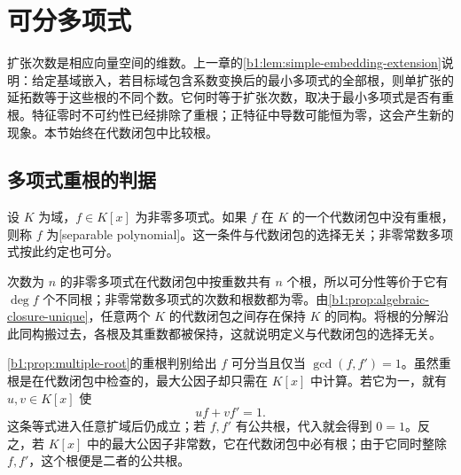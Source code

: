 
\section{可分多项式}
\label{b1:sec:1601}


%
%

扩张次数是相应向量空间的维数。上一章的\cref{b1:lem:simple-embedding-extension}说明：给定基域嵌入，若目标域包含系数变换后的最小多项式的全部根，则单扩张的延拓数等于这些根的不同个数。它何时等于扩张次数，取决于最小多项式是否有重根。特征零时不可约性已经排除了重根；正特征中导数可能恒为零，这会产生新的现象。本节始终在代数闭包中比较根。

\subsection{多项式重根的判据}
\label{b1:subsec:1601:01}

\begin{definition}\label{b1:def:separable-polynomial}
	设 \(K\) 为域，\(f\in K[x]\) 为非零多项式。如果 \(f\) 在 \(K\) 的一个代数闭包中没有重根，则称 \(f\) 为[separable polynomial]。这一条件与代数闭包的选择无关；非零常数多项式按此约定也可分。
\end{definition}
次数为 \(n\) 的非零多项式在代数闭包中按重数共有 \(n\) 个根，所以可分性等价于它有 \(\deg f\) 个不同根；非零常数多项式的次数和根数都为零。由\cref{b1:prop:algebraic-closure-unique}，任意两个 \(K\) 的代数闭包之间存在保持 \(K\) 的同构。将根的分解沿此同构搬过去，各根及其重数都被保持，这就说明定义与代数闭包的选择无关。

\ProseParagraphBreak
\cref{b1:prop:multiple-root}的重根判别给出 \(f\) 可分当且仅当 \(\gcd(f,f')=1\)。虽然重根是在代数闭包中检查的，最大公因子却只需在 \(K[x]\) 中计算。若它为一，就有 \(u,v\in K[x]\) 使
\[
	uf+vf'=1.
\]
这条等式进入任意扩域后仍成立；若 \(f,f'\) 有公共根，代入就会得到 \(0=1\)。反之，若 \(K[x]\) 中的最大公因子非常数，它在代数闭包中必有根；由于它同时整除 \(f,f'\)，这个根便是二者的公共根。

